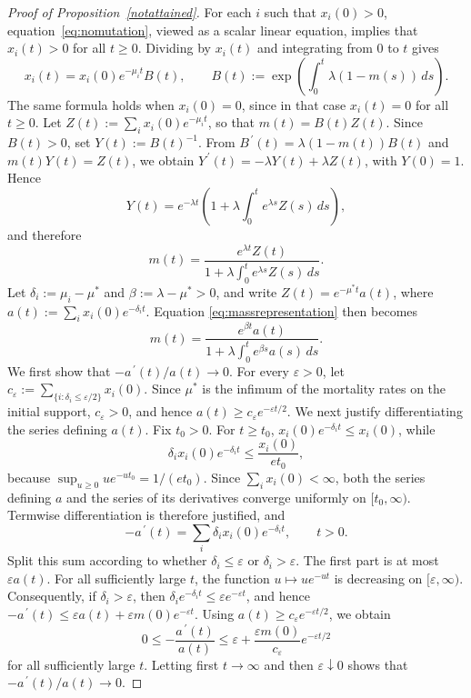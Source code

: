 \documentclass[12pt]{article}
\newcommand{\myprime}{\,\prime}
\begin{document}
\begin{proof}[Proof of Proposition~\ref{notattained}]
For each $i$ such that $x_i(0)>0$, equation~\eqref{eq:nomutation},
viewed as a scalar linear equation, implies that $x_i(t)>0$ for all
$t\geq0$. Dividing by $x_i(t)$ and integrating from $0$ to $t$ gives
$$
x_i(t)=x_i(0)e^{-\mu_i t}B(t),
\qquad
B(t):=\exp\left(\int_0^t\lambda(1-m(s))\,ds\right).
$$
The same formula holds when $x_i(0)=0$, since in that case
$x_i(t)=0$ for all $t\geq0$. Let
$Z(t):=\sum_i x_i(0)e^{-\mu_i t}$, so that $m(t)=B(t)Z(t)$.
Since $B(t)>0$, set $Y(t):=B(t)^{-1}$. From
$B^{\myprime}(t)=\lambda(1-m(t))B(t)$ and $m(t)Y(t)=Z(t)$, we obtain
$Y^{\myprime}(t)=-\lambda Y(t)+\lambda Z(t)$, with $Y(0)=1$. Hence
$$
Y(t)=e^{-\lambda t}
\left(1+\lambda\int_0^t e^{\lambda s}Z(s)\,ds\right),
$$
and therefore
\begin{equation}
m(t)
=
\frac{e^{\lambda t}Z(t)}
{1+\lambda\int_0^t e^{\lambda s}Z(s)\,ds}.
\label{eq:massrepresentation}
\end{equation}
Let $\delta_i:=\mu_i-\mu^*$ and
$\beta:=\lambda-\mu^*>0$, and write
$Z(t)=e^{-\mu^*t}a(t)$, where
$a(t):=\sum_i x_i(0)e^{-\delta_i t}$. Equation
\eqref{eq:massrepresentation} then becomes
\begin{equation}
m(t)
=
\frac{e^{\beta t}a(t)}
{1+\lambda\int_0^t e^{\beta s}a(s)\,ds}.
\label{eq:massrepresentation2}
\end{equation}
We first show that $-a^{\myprime}(t)/a(t)\to 0$. For every $\varepsilon>0$, let
$c_\varepsilon:=\sum_{\{i:\delta_i\leq\varepsilon/2\}}x_i(0)$.
Since $\mu^*$ is the infimum of the mortality rates on the initial
support, $c_\varepsilon>0$, and hence
$a(t)\geq c_\varepsilon e^{-\varepsilon t/2}$.
We next justify differentiating the series defining $a(t)$. Fix
$t_0>0$. For $t\geq t_0$,
$x_i(0)e^{-\delta_i t}\leq x_i(0)$, while
$$
\delta_i x_i(0)e^{-\delta_i t}
\leq \frac{x_i(0)}{e t_0},
$$
because $\sup_{u\geq0}ue^{-ut_0}=1/(e t_0)$. Since
$\sum_i x_i(0)<\infty$, both the series defining $a$ and the series of
its derivatives converge uniformly on $[t_0,\infty)$. Termwise
differentiation is therefore justified, and
$$
-a^{\myprime}(t)=\sum_i\delta_i x_i(0)e^{-\delta_i t},
\qquad t>0.
$$
Split this sum according to whether $\delta_i\leq\varepsilon$ or
$\delta_i>\varepsilon$. The first part is at most $\varepsilon a(t)$.
For all sufficiently large $t$, the function
$u\mapsto ue^{-ut}$ is decreasing on $[\varepsilon,\infty)$.
Consequently, if $\delta_i>\varepsilon$, then
$\delta_i e^{-\delta_i t}\leq\varepsilon e^{-\varepsilon t}$, and
hence
$-a^{\myprime}(t) \leq \varepsilon a(t)+\varepsilon m(0)e^{-\varepsilon t}$.
Using $a(t)\geq c_\varepsilon e^{-\varepsilon t/2}$, we obtain
$$
0\leq-\frac{a^{\myprime}(t)}{a(t)}
\leq
\varepsilon+
\frac{\varepsilon m(0)}{c_\varepsilon}
e^{-\varepsilon t/2}
$$
for all sufficiently large $t$. Letting first $t\to\infty$ and then
$\varepsilon\downarrow0$ shows that $-a^{\myprime}(t)/a(t)\to 0$.


\end{proof}
\end{document}
